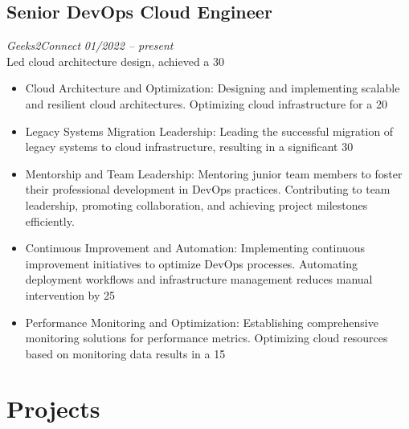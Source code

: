 \documentclass[a4paper,10pt]{article}
\begin{document}
\subsection*{Senior DevOps Cloud Engineer}
\textit{Geeks2Connect} \hfill \textit{01/2022 – present}\\
Led cloud architecture design, achieved a 30%
\begin{itemize}
    \item Cloud Architecture and Optimization: Designing and implementing scalable and resilient cloud architectures. Optimizing cloud infrastructure for a 20%
    \item Legacy Systems Migration Leadership: Leading the successful migration of legacy systems to cloud infrastructure, resulting in a significant 30%
    \item Mentorship and Team Leadership: Mentoring junior team members to foster their professional development in DevOps practices. Contributing to team leadership, promoting collaboration, and achieving project milestones efficiently.
    \item Continuous Improvement and Automation: Implementing continuous improvement initiatives to optimize DevOps processes. Automating deployment workflows and infrastructure management reduces manual intervention by 25%
    \item Performance Monitoring and Optimization: Establishing comprehensive monitoring solutions for performance metrics. Optimizing cloud resources based on monitoring data results in a 15%
\end{itemize}

\section*{Projects}
\end{document}
